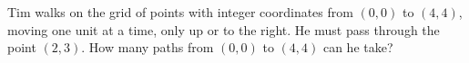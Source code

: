 Tim walks on the grid of points with integer coordinates from $(0,0)$ to $(4,4)$, moving one unit at a time, only up or to the right. He must pass through the point $(2,3)$. How many paths from $(0,0)$ to $(4,4)$ can he take?
